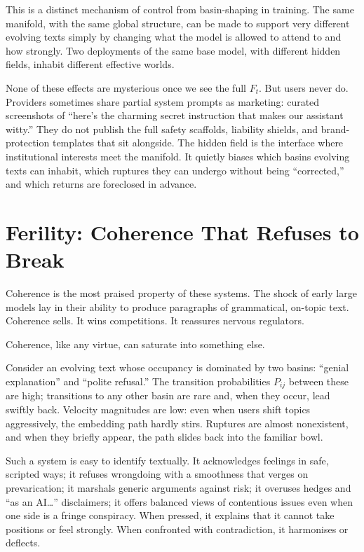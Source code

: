 \documentclass[12pt,a4paper]{report}
\begin{document}
This is a distinct mechanism of control from basin-shaping in training. The same manifold, with the same global structure, can be made to support very different evolving texts simply by changing what the model is allowed to attend to and how strongly. Two deployments of the same base model, with different hidden fields, inhabit different effective worlds.

None of these effects are mysterious once we see the full $F_t$. But users never do. Providers sometimes share partial system prompts as marketing: curated screenshots of ``here's the charming secret instruction that makes our assistant witty.'' They do not publish the full safety scaffolds, liability shields, and brand-protection templates that sit alongside. The hidden field is the interface where institutional interests meet the manifold. It quietly biases which basins evolving texts can inhabit, which ruptures they can undergo without being ``corrected,'' and which returns are foreclosed in advance.

\section{Ferility: Coherence That Refuses to Break}

Coherence is the most praised property of these systems. The shock of early large models lay in their ability to produce paragraphs of grammatical, on-topic text. Coherence sells. It wins competitions. It reassures nervous regulators.

Coherence, like any virtue, can saturate into something else.

Consider an evolving text whose occupancy is dominated by two basins: ``genial explanation'' and ``polite refusal.'' The transition probabilities $P_{ij}$ between these are high; transitions to any other basin are rare and, when they occur, lead swiftly back. Velocity magnitudes are low: even when users shift topics aggressively, the embedding path hardly stirs. Ruptures are almost nonexistent, and when they briefly appear, the path slides back into the familiar bowl.

Such a system is easy to identify textually. It acknowledges feelings in safe, scripted ways; it refuses wrongdoing with a smoothness that verges on prevarication; it marshals generic arguments against risk; it overuses hedges and ``as an AI\ldots'' disclaimers; it offers balanced views of contentious issues even when one side is a fringe conspiracy. When pressed, it explains that it cannot take positions or feel strongly. When confronted with contradiction, it harmonises or deflects.
\end{document}
